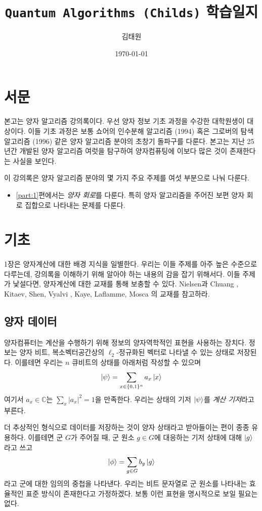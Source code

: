 \documentclass[a4paper,chapter,atbegshi]{oblivoir}
\title{\texttt{Quantum Algorithms (Childs)} 학습일지}
\author{김태원}
\date{\today}
\begin{document}
\maketitle
\tableofcontents
\frontmatter
\chapter{서문}
본고는 양자 알고리즘 강의록이다. 우선 양자 정보 기초 과정을 수강한 대학원생이
대상이다. 이들 기초 과정은 보통 쇼어의 인수분해 알고리즘 (1994) 혹은 그로버의
탐색 알고리즘 (1996) 같은 양자 알고리즘 분야의 초창기 돌파구를 다룬다. 본고는
지난 25년간 개발된 양자 알고리즘 여럿을 탐구하여 양자컴퓨팅에 이보다 많은 것이
존재한다는 사실을 보인다.

이 강의록은 양자 알고리즘 분야의 몇 가지 주요 주제를 여섯 부분으로 나눠 다룬다.

\hfill
\begin{itemize}
  \item \ref{part:1}편에서는 \emph{양자 회로}를 다룬다. 특히 양자 알고리즘을
    주어진 보편 양자 회로 집합으로 나타내는 문제를 다룬다.
\end{itemize}
\mainmatter
\chapter{기초}
1장은 양자계산에 대한 배경 지식을 일별한다. 우리는 이들 주제를 아주 높은 수준으로
다루는데, 강의록을 이해하기 위해 알아야 하는 내용의 감을 잡기 위해서다. 이들
주제가 낯설다면, 양자계산에 대한 교재를 통해 보충할 수 있다. Nielsen과 Chuang
\cite{nielsen00}, Kitaev, Shen, Vyalvi \cite{kitaev02}, Kaye, Laflamme, Mosca
\cite{kaye06}의 교재를 참고하라.
\section{양자 데이터}
양자컴퓨터는 계산을 수행하기 위해 정보의 양자역학적인 표현을 사용하는 장치다.
정보는 양자 비트, 복소벡터공간상의 $\ell_2$-정규화된 벡터로 나타낼 수 있는 상태로
저장된다. 이를테면 우리는 $n$ 큐비트의 상태를 아래처럼 작성할 수 있으며
\begin{equation}
  \ket{\psi} = \sum_{x\in\{0,1\}^n}a_x\ket{x}
\end{equation}
여기서 $a_x\in\mathbb{C}$는 $\sum_x|a_x|^2=1$을 만족한다. 우리는 상태의 기저
$\ket{\psi}$를 \emph{계산 기저}라고 부른다. 

더 추상적인 형식으로 데이터를 저장하는 것이 양자 상태라고 받아들이는 편이
종종 유용하다. 이를테면 군 $G$가 주어질 때, 군 원소 $g\in G$에 대응하는
기저 상태에 대해 $\ket{g}$라고 쓰고
\begin{equation}
  \ket{\phi} = \sum_{g\in G}b_g\ket{g}
\end{equation}
라고 군에 대한 임의의 중첩을 나타낸다. 우리는 비트 문자열로 군 원소를 나타내는
효율적인 표준 방식이 존재한다고 가정하겠다. 보통 이런 표현을 명시적으로 보일
필요는 없다.
\end{document}
